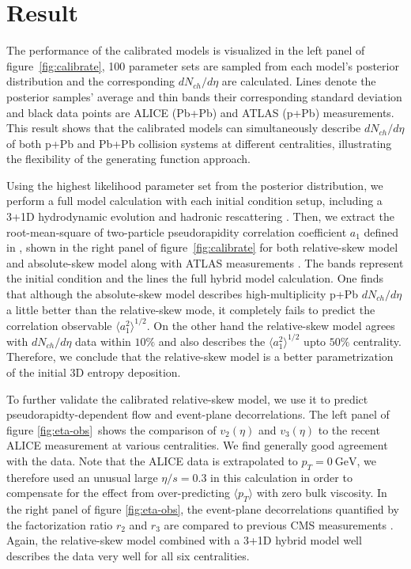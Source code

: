 \documentclass[3p,times,twocolumn]{elsarticle}
\begin{document}
\section{Result}
\label{Result}
The performance of the calibrated models is visualized in the left panel of figure~\ref{fig:calibrate}, 100 parameter sets are sampled from each model's posterior distribution and the corresponding $dN_{ch}/d\eta$ are calculated.
Lines denote the posterior samples' average and thin bands their corresponding standard deviation and black data points are ALICE (Pb+Pb) \cite{Abbas:2013bpa, ALICE:2015kda} and ATLAS (p+Pb) \cite{Aad:2015zza} measurements.
This result shows that the calibrated models can simultaneously describe $dN_{ch}/d\eta$ of both p+Pb and Pb+Pb collision systems at different centralities, illustrating the flexibility of the generating function approach.

Using the highest likelihood parameter set from the posterior distribution, we perform a full model calculation with each initial condition setup, including a 3+1D hydrodynamic evolution \cite{Karpenko:2013wva} and hadronic rescattering \cite{Bass:1998ca, Bleicher:1999xi}.
Then, we extract the root-mean-square of two-particle pseudorapidity correlation coefficient $a_1$ defined in \cite{Bzdak:2012tp}, shown in the right panel of figure~\ref{fig:calibrate} for both relative-skew model and absolute-skew model along with ATLAS measurements \cite{ATLAS:2015kla}. 
The bands represent the initial condition and the lines the full hybrid model calculation.
One finds that although the absolute-skew model describes high-multiplicity p+Pb $dN_{ch}/d\eta$ a little better than the relative-skew mode, it completely fails to predict the correlation observable $\langle a_1^2\rangle^{1/2}$.
On the other hand the relative-skew model agrees with $dN_{ch}/d\eta$ data within $10\%$ and also describes the $\langle a_1^2\rangle^{1/2}$ upto $50\%$ centrality.
Therefore, we conclude that the relative-skew model is a better parametrization of the initial 3D entropy deposition. 

To further validate the calibrated relative-skew model, we use it to predict  pseudorapidty-dependent flow and event-plane decorrelations.
The left panel of figure \ref{fig:eta-obs}~shows the comparison of $v_2(\eta)$ and $v_3(\eta)$ to the recent ALICE measurement \cite{Adam:2016ows} at various centralities. We find generally good agreement with the data.
Note that the ALICE data is extrapolated to $p_T = 0~\textrm{GeV}$, we therefore used an unusual large $\eta/s=0.3$ in this calculation in order to compensate for the effect from over-predicting $\langle p_T\rangle$ with zero bulk viscosity.
In the right panel of figure \ref{fig:eta-obs}, the event-plane decorrelations quantified by the factorization ratio $r_2$ and $r_3$ are compared to previous CMS measurements \cite{Khachatryan:2015oea}.
Again, the relative-skew model combined with a 3+1D hybrid model well describes the data very well for all six centralities.
\end{document}
